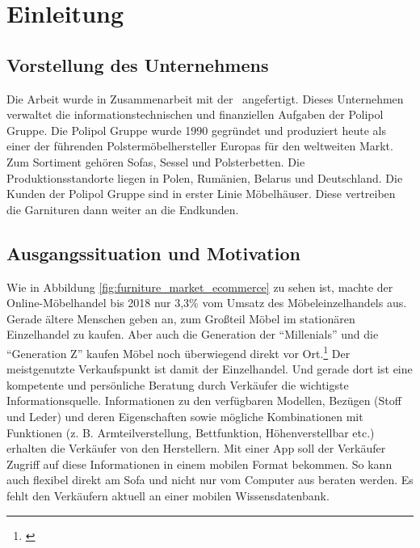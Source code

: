 \section{Einleitung}

\subsection{Vorstellung des Unternehmens}
Die Arbeit wurde in Zusammenarbeit mit der \koorperationsunternehmen~angefertigt. Dieses Unternehmen verwaltet die informationstechnischen und finanziellen Aufgaben der Polipol Gruppe. Die Polipol Gruppe wurde 1990 gegründet und produziert heute als einer der führenden Polstermöbelhersteller Europas für den weltweiten Markt. Zum Sortiment gehören Sofas, Sessel und Polsterbetten. Die Produktionsstandorte liegen in Polen, Rumänien, Belarus und Deutschland. Die Kunden der Polipol Gruppe sind in erster Linie Möbelhäuser. Diese vertreiben die Garnituren dann weiter an die Endkunden.

\subsection{Ausgangssituation und Motivation}

Wie in Abbildung \ref{fig:furniture_market_ecommerce} zu sehen ist, machte der Online-Möbelhandel bis 2018 nur {3,3\%} vom Umsatz des Möbeleinzelhandels aus. Gerade ältere Menschen geben an, zum Großteil Möbel im stationären Einzelhandel zu kaufen. Aber auch die Generation der \enquote{Millenials} und die \enquote{Generation Z} kaufen Möbel noch überwiegend direkt vor Ort.\footnote{\cite[Vgl.][]{Statista2021b}} Der meistgenutzte Verkaufspunkt ist damit der Einzelhandel. Und gerade dort ist eine kompetente und persönliche Beratung durch Verkäufer die wichtigste Informationsquelle. Informationen zu den verfügbaren Modellen, Bezügen (Stoff und Leder) und deren Eigenschaften sowie mögliche Kombinationen mit Funktionen (z. B. Armteilverstellung, Bettfunktion, Höhenverstellbar etc.) erhalten die Verkäufer von den Herstellern. Mit einer App soll der Verkäufer Zugriff auf diese Informationen in einem mobilen Format bekommen. So kann auch flexibel direkt am Sofa und nicht nur vom Computer aus beraten werden. Es fehlt den Verkäufern aktuell an einer mobilen Wissensdatenbank.

